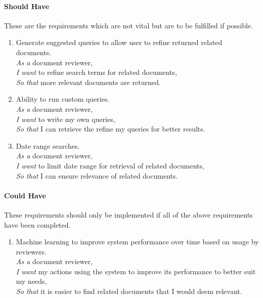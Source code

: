 \documentclass{l4proj}
\begin{document}
\paragraph{Should Have}
These are the requirements which are not vital but are to be fulfilled if possible.
\begin{enumerate}[label=\textbf{S.\arabic*}]
\item Generate suggested queries to allow user to refine returned related documents. \\
\textit{As a} document reviewer, \\
\textit{I want} to refine search terms for related documents, \\
\textit{So that} more relevant documents are returned.
\item Ability to run custom queries. \\
\textit{As a} document reviewer, \\
\textit{I want} to write my own queries, \\
\textit{So that} I can retrieve the refine my queries for better results.
\item Date range searches. \\
\textit{As a} document reviewer, \\
\textit{I want} to limit date range for retrieval of related documents, \\
\textit{So that} I can ensure relevance of related documents.
\end{enumerate}
\paragraph{Could Have}
These requirements should only be implemented if all of the above requirements have been completed.
\begin{enumerate}[label=\textbf{C.\arabic*}]
\item Machine learning to improve system performance over time based on usage by reviewers. \\
\textit{As a} document reviewer, \\
\textit{I want} my actions using the system to improve its performance to better suit my needs, \\
\textit{So that} it is easier to find related documents that I would deem relevant.
\end{enumerate}
\end{document}

